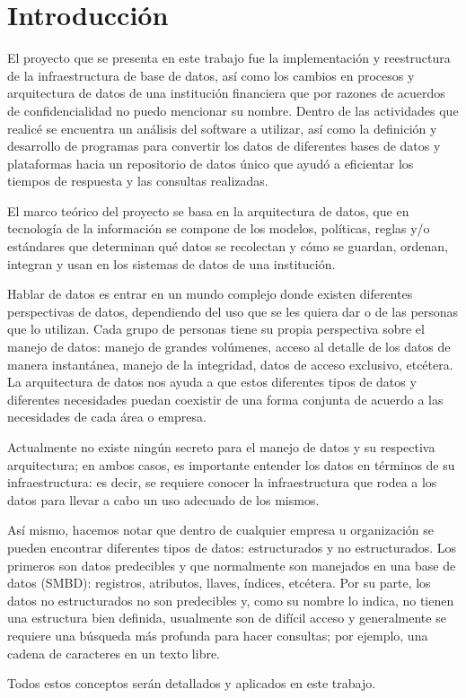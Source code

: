 \chapter{Introducción}
\label{cap:introduccion}

El proyecto que se presenta en este trabajo fue la implementación y reestructura
de la infraestructura de base de datos, así como los cambios en procesos y
arquitectura de datos de una institución financiera que por razones de acuerdos
de confidencialidad no puedo mencionar su nombre. Dentro de las actividades que
realicé se encuentra un análisis del software a utilizar, así como la definición
y desarrollo de programas para convertir los datos de diferentes bases de datos
y plataformas hacia un repositorio de datos único que ayudó a eficientar los
tiempos de respuesta y las consultas realizadas.

El marco teórico del proyecto se basa en la arquitectura de datos, que en
tecnología de la información se compone de los modelos, políticas, reglas y/o
estándares que determinan qué datos se recolectan y cómo se guardan, ordenan,
integran y usan en los sistemas de datos de una institución.

Hablar de datos es entrar en un mundo complejo donde existen diferentes
perspectivas de datos, dependiendo del uso que se les quiera dar o de las
personas que lo utilizan. Cada grupo de personas tiene su propia perspectiva
sobre el manejo de datos: manejo de grandes volúmenes, acceso al detalle de los
datos de manera instantánea, manejo de la integridad, datos de acceso exclusivo,
etcétera. La arquitectura de datos nos ayuda a que estos diferentes tipos de
datos y diferentes necesidades puedan coexistir de una forma conjunta de acuerdo
a las necesidades de cada área o empresa.

Actualmente no existe ningún secreto para el manejo de datos y su respectiva
arquitectura; en ambos casos, es importante entender los datos en términos de su
infraestructura: es decir, se requiere conocer la infraestructura que rodea a
los datos para llevar a cabo un uso adecuado de los mismos.

Así mismo, hacemos notar que dentro de cualquier empresa u organización se
pueden encontrar diferentes tipos de datos: estructurados y no
estructurados. Los primeros son datos predecibles y que normalmente son
manejados en una base de datos (SMBD): registros, atributos, llaves, índices,
etcétera. Por su parte, los datos no estructurados no son predecibles y, como su
nombre lo indica, no tienen una estructura bien definida, usualmente son de
difícil acceso y generalmente se requiere una búsqueda más profunda para hacer
consultas; por ejemplo, una cadena de caracteres en un texto libre.

Todos estos conceptos serán detallados y aplicados en este trabajo.

\cleardoublepage

